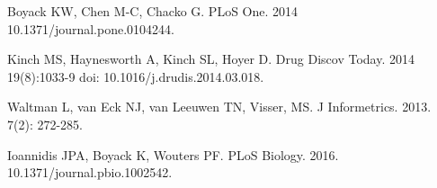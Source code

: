 \documentclass[10pt,letterpaper]{article}
\begin{document}
\begin{thebibliography}{10}
Boyack KW, Chen M-C, Chacko G. 
\newblock  PLoS One. 2014 10.1371/journal.pone.0104244.

Kinch MS, Haynesworth A, Kinch SL, Hoyer D.
\newblock  Drug Discov Today. 2014 19(8):1033-9 doi: 10.1016/j.drudis.2014.03.018.

Waltman L, van Eck NJ, van Leeuwen TN, Visser, MS.
\newblock  J Informetrics. 2013. 7(2): 272-285.

Ioannidis JPA, Boyack K, Wouters PF.
\newblock  PLoS Biology. 2016. 10.1371/journal.pbio.1002542.

\end{thebibliography}
\end{document}
